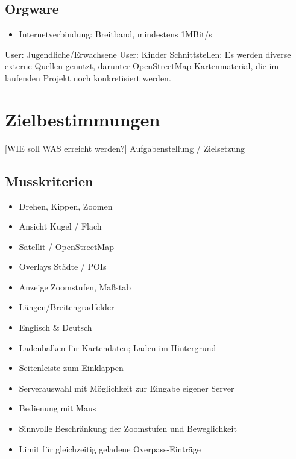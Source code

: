 \documentclass[10pt]{scrreprt}
\begin{document}
\section{Orgware}
\begin{itemize}
\item Internetverbindung: Breitband, mindestens 1MBit/s
\end{itemize}

User: Jugendliche/Erwachsene
User: Kinder
Schnittstellen: Es  werden  diverse  externe  Quellen genutzt, darunter OpenStreetMap Kartenmaterial, die im laufenden Projekt noch konkretisiert werden.






\chapter{Zielbestimmungen}
[WIE soll WAS erreicht werden?]
Aufgabenstellung / Zielsetzung

\section{Musskriterien}
\begin{itemize}
\item Drehen, Kippen, Zoomen
\item Ansicht Kugel / Flach
\item Satellit / OpenStreetMap
\item Overlays Städte / POIs
\item Anzeige Zoomstufen, Maßstab
\item Längen/Breitengradfelder
\item Englisch \& Deutsch
\item Ladenbalken für Kartendaten; Laden im Hintergrund
\item Seitenleiste zum Einklappen
\item Serverauswahl mit Möglichkeit zur Eingabe eigener Server
\item Bedienung mit Maus 
\item Sinnvolle Beschränkung der Zoomstufen und Beweglichkeit 
\item Limit für gleichzeitig geladene Overpass-Einträge
\end{itemize}
\end{document}
